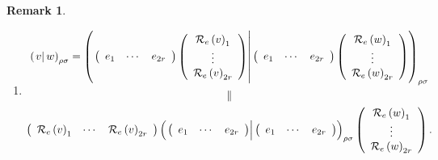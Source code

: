 \documentclass[aps,preprint]{revtex4}
\newtheorem{remark}[theorem]{Remark}
\begin{document}
\begin{remark}
\begin{enumerate}
\begin{enumerate}
\item 
\begin{gather}
\left( \left. v\right\vert w\right) _{\rho \sigma }=\left( \left. \overset{}{%
\left( 
\begin{array}{ccc}
e_{1} & \cdots & e_{2r}%
\end{array}%
\right) \left( 
\begin{array}{c}
\mathcal{R}_{e}\left( v\right) _{1} \\ 
\vdots \\ 
\mathcal{R}_{e}\left( v\right) _{2r}%
\end{array}%
\right) }\right\vert \left( 
\begin{array}{ccc}
e_{1} & \cdots & e_{2r}%
\end{array}%
\right) \left( 
\begin{array}{c}
\mathcal{R}_{e}\left( w\right) _{1} \\ 
\vdots \\ 
\mathcal{R}_{e}\left( w\right) _{2r}%
\end{array}%
\right) \right) _{\rho \sigma } \\
\parallel \\
\left( 
\begin{array}{ccc}
\mathcal{R}_{e}\left( v\right) _{1} & \cdots & \mathcal{R}_{e}\left(
v\right) _{2r}%
\end{array}%
\right) \left( \left. \overset{}{\left( 
\begin{array}{ccc}
e_{1} & \cdots & e_{2r}%
\end{array}%
\right) }\right\vert \left( 
\begin{array}{ccc}
e_{1} & \cdots & e_{2r}%
\end{array}%
\right) \right) _{\rho \sigma }\left( 
\begin{array}{c}
\mathcal{R}_{e}\left( w\right) _{1} \\ 
\vdots \\ 
\mathcal{R}_{e}\left( w\right) _{2r}%
\end{array}%
\right) .
\end{gather}


\end{enumerate}
\end{enumerate}
\end{remark}
\end{document}
